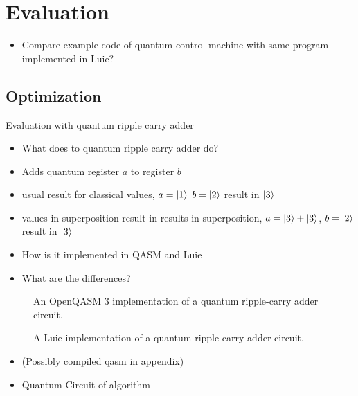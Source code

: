 \chapter{Evaluation}
\label{ch:evaluation}

\begin{itemize}
    \item Compare example code of quantum control machine with same program implemented in Luie?
\end{itemize}

\section{Optimization}
\label{sec:eval_optimization}
Evaluation with quantum ripple carry adder~\cite{CDKM04}
\begin{itemize}
    \item What does to quantum ripple carry adder do?
    \item Adds quantum register $a$ to register $b$
    \item usual result for classical values, $a = \ket{1}$ $b = \ket{2}$ result in $\ket{3}$
    \item values in superposition result in results in superposition, $a = \ket{3} + \ket{3}$, $b = \ket{2}$ result in $\ket{3}$
    \item How is it implemented in QASM and Luie
    \item What are the differences?
\end{itemize}

\begin{figure}[htp]
    \centering     
    
    \caption{An OpenQASM 3 implementation of a quantum ripple-carry adder circuit.}
    \label{fig:eval_adder_qasm}
\end{figure}

\begin{figure}[htp]
    \centering     
    
    \caption{A Luie implementation of a quantum ripple-carry adder circuit.}
    \label{fig:eval_adder_luie}
\end{figure}

\begin{itemize}
    \item (Possibly compiled qasm in appendix)
    \item Quantum Circuit of algorithm  
\end{itemize}

